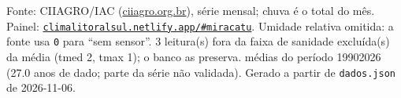 \documentclass[10pt,a4paper]{article}
\begin{document}
\vspace{1pt}
{\tiny\color{cinza}
Fonte: CIIAGRO/IAC (\href{http://ciiagro.org.br}{ciiagro.org.br}), série mensal;
chuva é o total do mês. Painel:
\href{https://climalitoralsul.netlify.app/\#miracatu}%
{\texttt{climalitoralsul.netlify.app/\#miracatu}}.
Umidade relativa omitida: a fonte usa \texttt{0} para ``sem sensor''.  3 leitura(s) fora da faixa de sanidade excluída(s) da média (tmed 2, tmax 1); o banco as preserva.
médias do período 1990\textendash{}2026 (27.0 anos de dado; parte da série não validada).
Gerado a partir de \texttt{dados.json} de 2026-11-06.}
\end{document}
